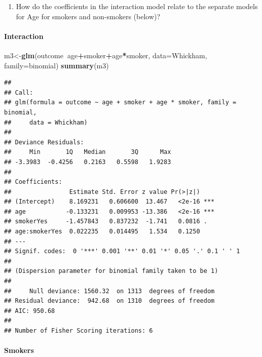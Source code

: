 \documentclass[]{article}
\newenvironment{Shaded}{\begin{snugshade}}{\end{snugshade}}
\newcommand{\DataTypeTok}[1]{\textcolor[rgb]{0.13,0.29,0.53}{#1}}
\newcommand{\KeywordTok}[1]{\textcolor[rgb]{0.13,0.29,0.53}{\textbf{#1}}}
\newcommand{\NormalTok}[1]{#1}
\newcommand{\OperatorTok}[1]{\textcolor[rgb]{0.81,0.36,0.00}{\textbf{#1}}}
\providecommand{\tightlist}{%
  \setlength{\itemsep}{0pt}\setlength{\parskip}{0pt}}
\let\oldparagraph\paragraph
\renewcommand{\paragraph}[1]{\oldparagraph{#1}\mbox{}}
\begin{document}
\vspace{3in}

\begin{enumerate}
\def\labelenumi{\arabic{enumi}.}
\setcounter{enumi}{11}
\tightlist
\item
  How do the coefficients in the interaction model relate to the
  separate models for Age for smokers and non-smokers (below)?
\end{enumerate}

\vspace{0.5in}

\hypertarget{interaction}{%
\paragraph{Interaction}\label{interaction}}

\begin{Shaded}
\begin{Highlighting}[]
\NormalTok{m3<-}\KeywordTok{glm}\NormalTok{(outcome}\OperatorTok{~}\NormalTok{age}\OperatorTok{+}\NormalTok{smoker}\OperatorTok{+}\NormalTok{age}\OperatorTok{*}\NormalTok{smoker, }\DataTypeTok{data=}\NormalTok{Whickham, }\DataTypeTok{family=}\NormalTok{binomial)}
\KeywordTok{summary}\NormalTok{(m3)}
\end{Highlighting}
\end{Shaded}

\begin{verbatim}
## 
## Call:
## glm(formula = outcome ~ age + smoker + age * smoker, family = binomial, 
##     data = Whickham)
## 
## Deviance Residuals: 
##     Min       1Q   Median       3Q      Max  
## -3.3983  -0.4256   0.2163   0.5598   1.9283  
## 
## Coefficients:
##                Estimate Std. Error z value Pr(>|z|)    
## (Intercept)    8.169231   0.606600  13.467   <2e-16 ***
## age           -0.133231   0.009953 -13.386   <2e-16 ***
## smokerYes     -1.457843   0.837232  -1.741   0.0816 .  
## age:smokerYes  0.022235   0.014495   1.534   0.1250    
## ---
## Signif. codes:  0 '***' 0.001 '**' 0.01 '*' 0.05 '.' 0.1 ' ' 1
## 
## (Dispersion parameter for binomial family taken to be 1)
## 
##     Null deviance: 1560.32  on 1313  degrees of freedom
## Residual deviance:  942.68  on 1310  degrees of freedom
## AIC: 950.68
## 
## Number of Fisher Scoring iterations: 6
\end{verbatim}

\hypertarget{smokers}{%
\paragraph{Smokers}\label{smokers}}
\end{document}
